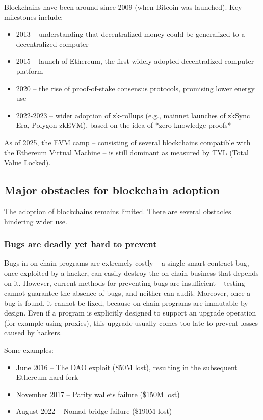 \documentclass[a4paper]{article}
\begin{document}
Blockchains have been around since 2009 (when Bitcoin was launched). Key milestones include:

\begin{itemize}
  \item 2013 -- understanding that decentralized money could be generalized to a decentralized computer
  \item 2015 -- launch of Ethereum, the first widely adopted decentralized-computer platform
  \item 2020 -- the rise of proof-of-stake consensus protocols, promising lower energy use
  \item 2022-2023 -- wider adoption of zk-rollups (e.g., mainnet launches of zkSync Era, Polygon zkEVM), based on the idea of *zero-knowledge proofs*
\end{itemize}

As of 2025, the EVM camp -- consisting of several blockchains compatible with the Ethereum Virtual Machine -- is still dominant as measured by TVL (Total Value Locked).

\subsection{Major obstacles for blockchain adoption}

The adoption of blockchains remains limited. There are several obstacles hindering wider use.

\subsubsection{Bugs are deadly yet hard to prevent}

Bugs in on-chain programs are extremely costly -- a single smart-contract bug, once exploited by a hacker, can easily destroy the on-chain business that depends on it. However, current methods for preventing bugs are insufficient -- testing cannot guarantee the absence of bugs, and neither can audit. Moreover, once a bug is found, it cannot be fixed, because on-chain programs are immutable by design. Even if a program is explicitly designed to support an upgrade operation (for example using proxies), this upgrade usually comes too late to prevent losses caused by hackers.

Some examples:
\begin{itemize}
\item June 2016 -- The DAO exploit (\$50M lost), resulting in the subsequent Ethereum hard fork
\item November 2017 -- Parity wallets failure (\$150M lost)
\item August 2022 -- Nomad bridge failure (\$190M lost)
\end{itemize}
\end{document}
